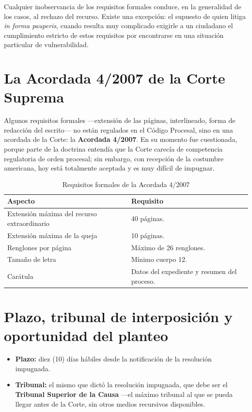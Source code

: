 \documentclass[12pt,oneside]{book}
\begin{document}
\begin{important}
Cualquier inobservancia de los requisitos formales conduce, en la generalidad de los casos, al rechazo del recurso. Existe una excepción: el supuesto de quien litiga \textit{in forma pauperis}, cuando resulta muy complicado exigirle a un ciudadano el cumplimiento estricto de estos requisitos por encontrarse en una situación particular de vulnerabilidad.
\end{important}

\section{La Acordada 4/2007 de la Corte Suprema}

Algunos requisitos formales ---extensión de las páginas, interlineado, forma de redacción del escrito--- no están regulados en el Código Procesal, sino en una acordada de la Corte: la \textbf{Acordada 4/2007}. En su momento fue cuestionada, porque parte de la doctrina entendía que la Corte carecía de competencia regulatoria de orden procesal; sin embargo, con recepción de la costumbre americana, hoy está totalmente aceptada y es muy difícil de impugnar.

\begin{table}[H]
\centering
\caption{Requisitos formales de la Acordada 4/2007}
\begin{tabularx}{\textwidth}{Q{0.38\textwidth}Y}
\toprule
\textbf{Aspecto} & \textbf{Requisito} \\
\midrule
Extensión máxima del recurso extraordinario & 40 páginas. \\
Extensión máxima de la queja & 10 páginas. \\
Renglones por página & Máximo de 26 renglones. \\
Tamaño de letra & Mínimo cuerpo 12. \\
Carátula & Datos del expediente y resumen del proceso. \\
\bottomrule
\end{tabularx}
\end{table}

\section{Plazo, tribunal de interposición y oportunidad del planteo}

\begin{itemize}
    \item \textbf{Plazo:} diez (10) días hábiles desde la notificación de la resolución impugnada.
    \item \textbf{Tribunal:} el mismo que dictó la resolución impugnada, que debe ser el \textbf{Tribunal Superior de la Causa} ---el máximo tribunal al que se pueda llegar antes de la Corte, sin otros medios recursivos disponibles.
\end{itemize}
\end{document}
